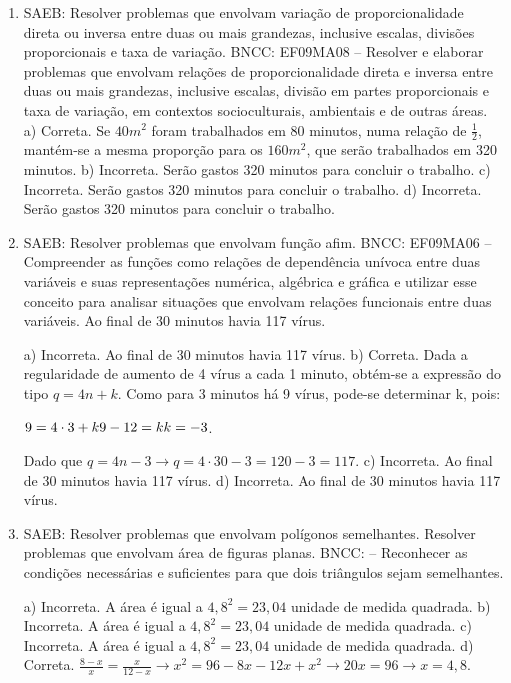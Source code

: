 \begin{enumerate}
\item
SAEB: Resolver problemas que envolvam variação de
proporcionalidade direta ou inversa entre duas ou mais grandezas,
inclusive escalas, divisões proporcionais e taxa de variação.
BNCC: EF09MA08 -- Resolver e elaborar problemas que envolvam relações de
proporcionalidade direta e inversa entre duas ou mais grandezas,
inclusive escalas, divisão em partes proporcionais e taxa de variação,
em contextos socioculturais, ambientais e de outras áreas.
a) Correta. Se $40 m^2$ foram trabalhados em 80 minutos, numa relação de
$\frac{1}{2}$, mantém-se a mesma proporção para os $160 m^2$, que serão
trabalhados em 320 minutos. 
b) Incorreta. Serão gastos 320 minutos para concluir o trabalho. 
c) Incorreta. Serão gastos 320 minutos para concluir o trabalho. 
d) Incorreta. Serão gastos 320 minutos para concluir o trabalho.

\item
SAEB: Resolver problemas que envolvam função afim.
BNCC: EF09MA06 -- Compreender as funções como relações de dependência
unívoca entre duas variáveis e suas representações numérica, algébrica e
gráfica e utilizar esse conceito para analisar situações que envolvam
relações funcionais entre duas variáveis.
Ao final de 30 minutos havia 117 vírus.

a) Incorreta. Ao final de 30 minutos havia 117 vírus.
b) Correta. Dada a regularidade de aumento de 4 vírus a cada 1 minuto, obtém-se 
a expressão do tipo $q = 4n + k$. Como para 3 minutos há
9 vírus, pode-se determinar k, pois: 

$9 = 4 \cdot3 + k \\
9 - 12 = k \\ 
k = - 3$.

Dado que $q = 4n - 3 \rightarrow q = 4 \cdot30 - 3 = 120 - 3 = 117$.
c) Incorreta. Ao final de 30 minutos havia 117 vírus.
d) Incorreta. Ao final de 30 minutos havia 117 vírus.

\item
SAEB: Resolver problemas que envolvam polígonos semelhantes.
Resolver problemas que envolvam área de figuras planas.
BNCC: -- Reconhecer as condições necessárias e suficientes para
que dois triângulos sejam semelhantes.

a) Incorreta. A área é igual a $4,8^2 = 23,04$ unidade de medida quadrada.
b) Incorreta. A área é igual a $4,8^2 = 23,04$ unidade de medida quadrada. 
c) Incorreta. A área é igual a $4,8^2 = 23,04$ unidade de medida quadrada. 
d) Correta. $\frac{8 - x}{x} = \frac{x}{12 - x} \rightarrow x^{2} = 96 - 8x - 12x + x^2 \rightarrow 20x = 96 \rightarrow x = 4,8$.


\end{enumerate}
